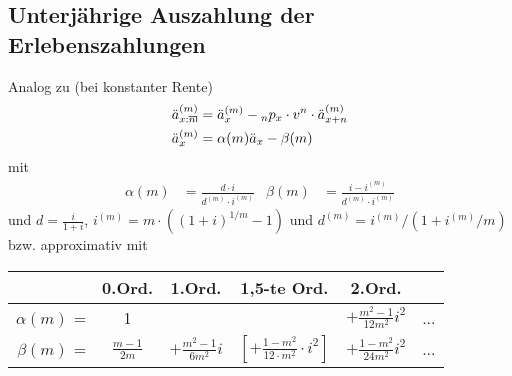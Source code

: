 \documentclass[a4paper,10pt]{article}
\makeatletter
\newcommand{\xn}{{\act[x]{n}}}
\DeclareRobustCommand{\act}[2][]{%
\def\arraystretch{0}%
\setlength\arraycolsep{0.5pt}%
\setlength\arrayrulewidth{0.5pt}%
\setbox0=\hbox{$\scriptstyle#1\ifx#1\empty{asdf}\else:\fi#2$}%
\begin{array}[b]{*2{@{}>{\scriptstyle}c}|}
\cline{2-2}%
\rule[1.25pt]{0pt}{\ht0}%
#1\ifx#1\empty\else:\fi & #2%
\end{array}%
}
\makeatother
\begin{document}
\subsection{Unterjährige Auszahlung der Erlebenszahlungen}

Analog zu (bei konstanter Rente)
\begin{align*}
 \ddot{a}^{(m)}_\xn &= \ddot{a}_x^{(m)} - {}_np_x \cdot v^n \cdot \ddot{a}_{x+n}^{(m)}\\
 \ddot{a}_x^{(m)} &= \alpha(m) \ddot{a}_x - \beta(m)
\end{align*}
mit 
\begin{align*}
 \alpha(m)&= \frac{d \cdot i}{d^{(m)} \cdot i^{(m)}} & \beta(m) &= \frac{i-i^{(m)}}{d^{(m)} \cdot i^{(m)}}
\end{align*}
und $d = \frac{i}{1+i}$, $i^{(m)} = m \cdot \left((1+i)^{1/m} -1\right)$ und $d^{(m)} = i^{(m)} / \left(1+i^{(m)}/m\right)$ bzw. approximativ mit
\begin{center}
\begin{tabular}{rccccc}
& 0.Ord. & 1.Ord. & 1,5-te Ord. & 2.Ord. & \\\hline
$\alpha(m)$ = & 1 &  & & $+\frac{m^2-1}{12 m^2} i^2$ & ...\\
$\beta(m)$ = & $\frac{m-1}{2m}$ & $+ \frac{m^2-1}{6 m^2}i$ & $\left[+ \frac{1-m^2}{12\cdot m^2}\cdot i^2\right]$ &$+ \frac{1-m^2}{24 m^2}i^2$ & ...\\[0.3em]\hline 
\end{tabular}
\end{center}
\end{document}
